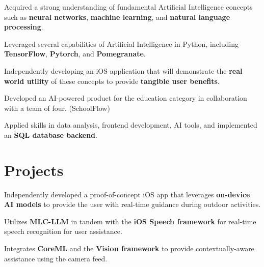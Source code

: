 \documentclass[letterpaper,10pt]{article}
\begin{document}
\begin{resume_list}
  \item Acquired a strong understanding of fundamental Artificial Intelligence concepts such as \textbf{neural networks}, \textbf{machine learning}, and \textbf{natural language processing}.
  \vspace{1pt}
  \item Leveraged several capabilities of Artificial Intelligence in Python, including \textbf{TensorFlow}, \textbf{Pytorch}, and \textbf{Pomegranate}.
  \vspace{1pt}
  \item Independently developing an iOS application that will demonstrate the \textbf{real world utility} of these concepts to provide \textbf{tangible user benefits}.
  \vspace{2pt}
\end{resume_list}

\begin{resume_list}
  \item Developed an AI-powered product for the education category in collaboration with a team of four. (SchoolFlow)
  \vspace{1pt}
  \item Applied skills in data analysis, frontend development, AI tools, and implemented an \textbf{SQL database backend}.
  \vspace{-2pt}
\end{resume_list}


\vspace{0pt}
\section{\large{Projects}}

\vspace{1pt}
\begin{resume_list}
  \vspace{1pt}
    \item Independently developed a proof-of-concept iOS app that leverages \textbf{on-device AI models} to provide the user with real-time guidance during outdoor activities.
    \vspace{1pt}
    \item Utilizes \textbf{MLC-LLM} in tandem with the \textbf{iOS Speech framework} for real-time speech recognition for user assistance.
    \vspace{1pt}
    \item Integrates \textbf{CoreML} and the \textbf{Vision framework} to provide contextually-aware assistance using the camera feed.
\end{resume_list}
\end{document}

